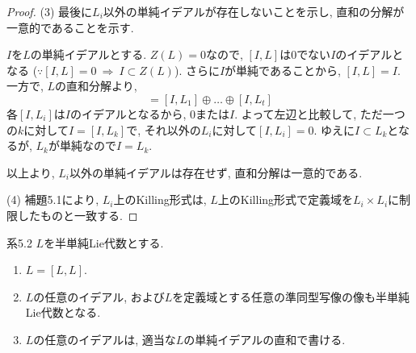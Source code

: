 \documentclass[a4paper,12pt]{ltjsarticle}
\begin{document}
\begin{proof}
  \medskip
  \noindent (3) 最後に$L_i$以外の単純イデアルが存在しないことを示し, 直和の分解が一意的であることを示す. 

  $I$を$L$の単純イデアルとする. $Z(L) = 0$なので, $[I, L]$は$0$でない$I$のイデアルとなる ($∵ [I, L] = 0 ~\Rightarrow ~ I \subset Z(L)$). さらに$I$が単純であることから, $[I, L] = I$. 一方で, $L$の直和分解より, 
  \begin{equation}
    [I, L] = [I, L_1] ⊕ \ldots ⊕ [I, L_t]
  \end{equation}
  各$[I, L_i]$は$I$のイデアルとなるから, $0$または$I$. よって左辺と比較して, ただ一つの$k$に対して$I = [I, L_k]$で, それ以外の$L_i$に対して$[I, L_i] = 0$. 
  ゆえに$I \subset L_k$となるが, $L_k$が単純なので$I = L_k$. 

  以上より, $L_i$以外の単純イデアルは存在せず, 直和分解は一意的である. 

  \medskip
  \noindent (4) 補題5.1により, $L_i$上のKilling形式は, $L$上のKilling形式で定義域を$L_i \times L_i$に制限したものと一致する. 
\end{proof}

\renewcommand{\labelenumi}{(\alph{enumi})}
\begin{thm}{系5.2}
  $L$を半単純Lie代数とする. 
  \begin{enumerate}
    \item $L = [L, L]$. 
    \item $L$の任意のイデアル, および$L$を定義域とする任意の準同型写像の像も半単純Lie代数となる. 
    \item $L$の任意のイデアルは, 適当な$L$の単純イデアルの直和で書ける. 
  \end{enumerate}
\end{thm}
\end{document}
